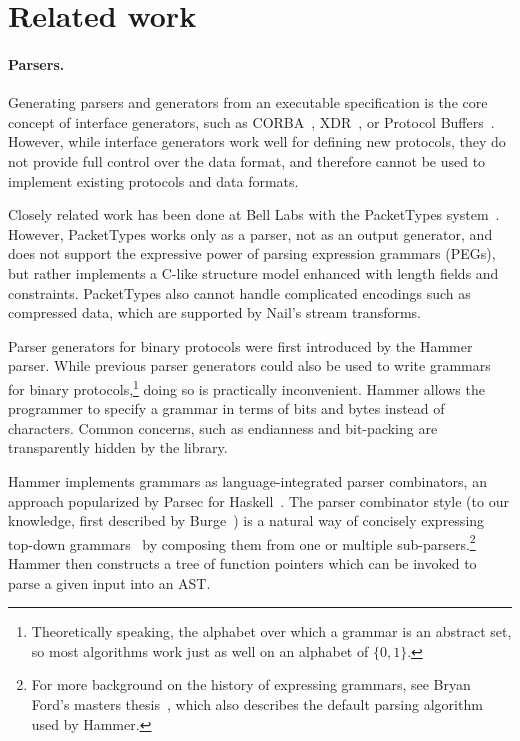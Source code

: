 \section{Related work}
\label{s:relwk}

\paragraph{Parsers.}

Generating parsers and generators from an executable specification is the
core concept of interface generators, such as CORBA~\cite{omg:corba},
XDR~\cite{rfc:1832}, or Protocol Buffers~\cite{varda2008}.  However,
while interface generators work well for defining new protocols, they
do not provide full control over the data format, and therefore cannot
be used to implement existing protocols and data formats.

Closely related work has been done at Bell Labs with the PacketTypes
system~\cite{mccann2000packet}.  However, PacketTypes works only as a
parser, not as an output generator, and does not support the expressive
power of parsing expression grammars (PEGs), but rather implements a
C-like structure model enhanced with length fields and constraints.
PacketTypes also cannot handle complicated encodings such as compressed
data, which are supported by Nail's stream transforms.

Parser generators for binary protocols were first introduced by the
Hammer~\cite{hammer-parser} parser.
While previous parser generators could also be used to write grammars
for binary protocols,\footnote{Theoretically speaking, the alphabet
over which a grammar is an abstract set, so most algorithms work
just as well on an alphabet of $\{0,1\}$.} doing so is practically
inconvenient. Hammer allows the programmer to specify a grammar in
terms of bits and bytes instead of characters. Common concerns, such as
endianness and bit-packing are transparently hidden by the library. 

Hammer implements grammars as language-integrated parser combinators, an approach popularized by
Parsec for Haskell~\cite{LeijenMeijer:parsec}. The parser combinator style (to our knowledge, first
described by Burge~\cite{burge1975recursive}) is a natural way of concisely expressing top-down
grammars~\cite{Danielsson:2010:TPC:1863543.1863585}
by composing them from one or multiple sub-parsers.\footnote{For more
background on the history of expressing grammars, see Bryan Ford's
masters thesis~\cite{ford2002packrat}, which also describes the
default parsing algorithm used by Hammer.}
Hammer then constructs a tree of function pointers which can be invoked to parse a given input into
an AST\@.

